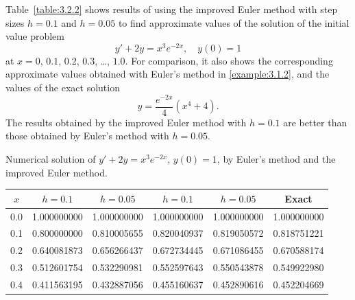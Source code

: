 \setcounter{example}{1}
\begin{example}
  \label{example:3.2.2} \rm Table~\ref{table:3.2.2} shows results of using the improved Euler method
  with step sizes $h=0.1$ and $h=0.05$ to find approximate values of the solution of the initial
  value problem
  \[
    y'+2y=x^{3}e^{-2x},\quad y(0)=1
  \]
  at $x=0$, $0.1$, $0.2$, $0.3$, \dots, $1.0$. For comparison, it also shows the corresponding
  approximate values obtained with Euler's method in \ref{example:3.1.2}, and the values of the
  exact solution
  \[
    y=\frac{e^{-2x}}{4}(x^{4}+4).
  \]
  The results obtained by the improved Euler method with $h=0.1$ are better than those obtained by
  Euler's method with $h=0.05$.
\end{example}
\setcounter{table}{1}
\begin{examplesolution}
\begin{newtable}
  \label{table:3.2.2} Numerical solution of $y'+2y=x^{3}e^{-2x}$, $y(0)=1$, by Euler's method and
  the improved Euler method.
  \begin{center}
    \begin{tabular}{|c|r|r|r|r|r|}
      \hline
      \multicolumn{1}{|c|}{$x$} & \multicolumn{1}{|c|}{$h=0.1$} & \multicolumn{1}{|c|}{$h=0.05$}      & \multicolumn{1}{|c|}{$h=0.1$} & \multicolumn{1}{|c|}{$h=0.05$} & \multicolumn{1}{|c|}{Exact} \\
      \hline
      0.0                       & 1.000000000                   & 1.000000000                         & 1.000000000                   & 1.000000000                    & 1.000000000                 \\
      0.1                       & 0.800000000                   & 0.810005655                         & 0.820040937                   & 0.819050572                    & 0.818751221                 \\
      0.2                       & 0.640081873                   & 0.656266437                         & 0.672734445                   & 0.671086455                    & 0.670588174                 \\
      0.3                       & 0.512601754                   & 0.532290981                         & 0.552597643                   & 0.550543878                    & 0.549922980                 \\
      0.4                       & 0.411563195                   & 0.432887056                         & 0.455160637                   & 0.452890616                    & 0.452204669                 \\

\end{tabular}
\end{center}
\end{newtable}
\end{examplesolution}
